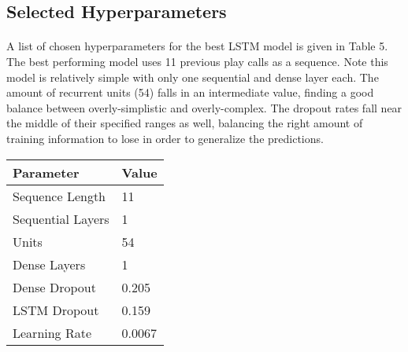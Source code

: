 \documentclass[11pt]{article}
\begin{document}
\begin{multicols*}{2}
        
        \subsection{Selected Hyperparameters}

            \paragraph{}
                A list of chosen hyperparameters for the best LSTM model is given in Table 5. 
                The best performing model uses 11 previous play calls as a sequence. 
                Note this model is relatively simple with only one sequential and dense layer each.
                The amount of recurrent units (54) falls in an intermediate value, finding a good balance between overly-simplistic and overly-complex. 
                The dropout rates fall near the middle of their specified ranges as well, balancing the right amount of training information to lose in order to generalize the predictions.
                
        
        \begin{center}
        \begin{tabular}{|| m{3cm} | m{3cm}||}
            \hline
            \textbf{Parameter} & \textbf{Value}  \\
            \hline\hline
            Sequence Length & 11  \\
            \hline
            Sequential Layers & 1 \\
            \hline
            Units & 54 \\
            \hline
            Dense Layers & 1 \\
            \hline
            Dense Dropout & 0.205 \\
            \hline
            LSTM Dropout & 0.159 \\
            \hline
            Learning Rate & 0.0067\\
            \hline 
        \end{tabular}
        \end{center}


\end{multicols*}
\end{document}
